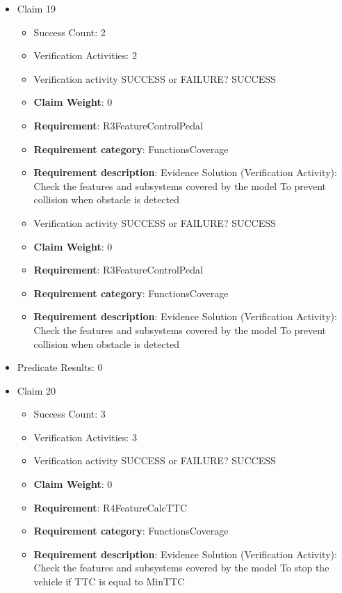 \documentclass{article}
\begin{document}
\begin{itemize}
  				  \item Claim 19
				\begin{itemize}
			    	\item Success Count: 2 
			    	\item Verification Activities: 2
					\item Verification activity SUCCESS or FAILURE? SUCCESS
					\item \textbf{Claim Weight}: 0
						\item \textbf{Requirement}: R3FeatureControlPedal 
						\item \textbf{Requirement category}: FunctionsCoverage 
						\item \textbf{Requirement description}: Evidence Solution (Verification Activity): Check the features and subsystems covered by the model  To prevent collision when obstacle is detected
					
					\item Verification activity SUCCESS or FAILURE? SUCCESS
					\item \textbf{Claim Weight}: 0
						\item \textbf{Requirement}: R3FeatureControlPedal 
						\item \textbf{Requirement category}: FunctionsCoverage 
						\item \textbf{Requirement description}: Evidence Solution (Verification Activity): Check the features and subsystems covered by the model  To prevent collision when obstacle is detected
					
				\end{itemize}
				
									    
				\item Predicate Results: 0

  				  \item Claim 20
				\begin{itemize}
			    	\item Success Count: 3 
			    	\item Verification Activities: 3
					\item Verification activity SUCCESS or FAILURE? SUCCESS
					\item \textbf{Claim Weight}: 0
						\item \textbf{Requirement}: R4FeatureCalcTTC 
						\item \textbf{Requirement category}: FunctionsCoverage 
						\item \textbf{Requirement description}: Evidence Solution (Verification Activity): Check the features and subsystems covered by the model  To stop the vehicle if TTC is equal to MinTTC
					

\end{itemize}
\end{itemize}
\end{document}
